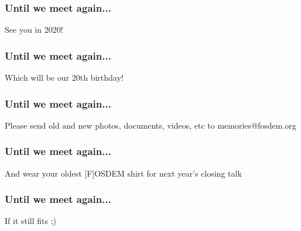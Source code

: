 \documentclass[aspectratio=169]{beamer}
\begin{document}
\begin{frame}
	\frametitle{Until we meet again...}
	\vfill
	\begin{center}
		{\Huge See you in 2020!}
	\end{center}
	\vfill
\end{frame}

\begin{frame}
	\frametitle{Until we meet again...}
	\vfill
	\begin{center}
		{\Huge Which will be our 20th birthday!}
	\end{center}
	\vfill
\end{frame}

\begin{frame}
	\frametitle{Until we meet again...}
	\vfill
	\begin{center}
		{\Huge Please send old and new photos, documents, videos, etc to memories@fosdem.org}
	\end{center}
	\vfill
\end{frame}

\begin{frame}
	\frametitle{Until we meet again...}
	\vfill
	\begin{center}
		{\Huge And wear your oldest [F]OSDEM shirt for next year's closing talk}
	\end{center}
	\vfill
\end{frame}

\begin{frame}
	\frametitle{Until we meet again...}
	\vfill
	\begin{center}
		{\Huge If it still fits ;)}
	\end{center}
	\vfill
\end{frame}
\end{document}
